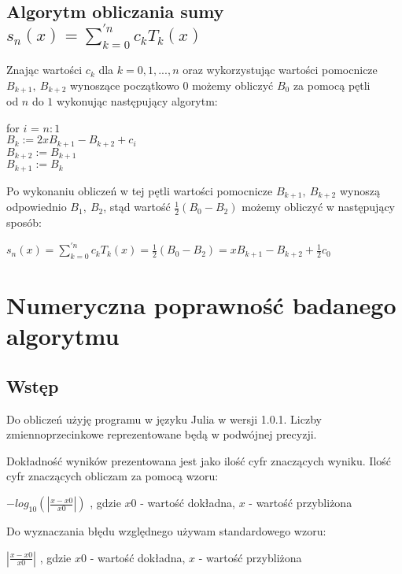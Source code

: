 \documentclass[10pt]{article}
\begin{document}
\subsection{Algorytm obliczania sumy $s_{n}(x) = \sum_{k=0}^{'n} c_{k} T_{k}(x)$}
Znając wartości $c_{k}$ dla $k = {0,1,...,n}$ oraz wykorzystując wartości pomocnicze $B_{k+1}, \: B_{k+2}$ wynoszące początkowo $0$ możemy obliczyć $B_{0}$ za pomocą pętli\\ od $n$ do $1$ wykonując następujący algorytm:
\begin{center}
for $i$ = $n:1$ \\
\vspace{0.15em} $B_{k} := 2x B_{k+1} - B_{k+2} + c_{i}$ \\
\vspace{0.15em} $B_{k+2} := B_{k+1}$\\
\vspace{0.15em} $B_{k+1} := B_{k}$
\end{center}
Po wykonaniu obliczeń w tej pętli wartości pomocnicze $B_{k+1}, \: B_{k+2}$ wynoszą odpowiednio $B_{1}, \: B_{2}$, stąd wartość $\frac{1}{2} ( B_{0} - B_{2} )$ możemy obliczyć w następujący sposób:
\begin{center}
$s_{n}(x) = \sum_{k=0}^{'n} c_{k} T_{k}(x) = \frac{1}{2} ( B_{0} - B_{2} ) = x B_{k+1} - B_{k+2} + \frac{1}{2} c_{0}$
\end{center}


\section{Numeryczna poprawność badanego algorytmu}
\subsection{Wstęp}
Do obliczeń użyję programu w języku Julia w wersji 1.0.1. Liczby zmiennoprzecinkowe reprezentowane będą w podwójnej precyzji. 

Dokładność wyników prezentowana jest jako ilość cyfr znaczących wyniku. Ilość cyfr znaczących obliczam za pomocą wzoru:
\begin{center}
$-log_{10}(|\frac{x-x0}{x0}|)$
, gdzie $x0$ - wartość dokładna, $x$ - wartość przybliżona
\end{center}
Do wyznaczania błędu względnego używam standardowego wzoru:
\begin{center}
$|\frac{x-x0}{x0}|$
, gdzie $x0$ - wartość dokładna, $x$ - wartość przybliżona
\end{center}
\end{document}
